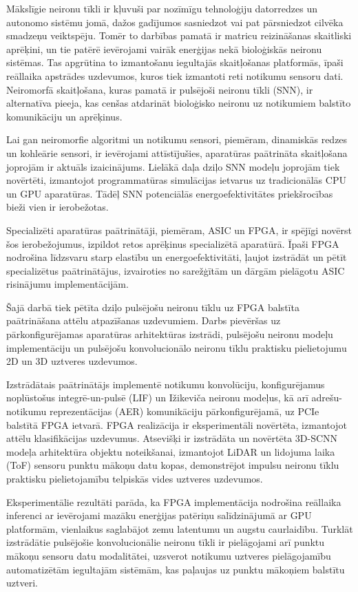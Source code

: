 
Mākslīgie neironu tīkli ir kļuvuši par nozīmīgu tehnoloģiju datorredzes un autonomo sistēmu jomā, dažos gadījumos sasniedzot
vai pat pārsniedzot cilvēka smadzeņu veiktspēju. Tomēr to darbības pamatā ir matricu reizināšanas skaitliski aprēķini, un tie patērē
ievērojami vairāk enerģijas nekā bioloģiskās neironu sistēmas. Tas apgrūtina to izmantošanu iegultajās skaitļošanas
platformās, īpaši reāllaika apstrādes uzdevumos, kuros tiek izmantoti reti notikumu sensoru dati. Neiromorfā
skaitļošana, kuras pamatā ir pulsējoši neironu tīkli (SNN), ir alternatīva pieeja, kas cenšas
atdarināt bioloģisko neironu uz notikumiem balstīto komunikāciju un aprēķinus.

Lai gan neiromorfie algoritmi un notikumu sensori, piemēram, dinamiskās redzes un kohleārie sensori, ir ievērojami
attīstījušies, aparatūras paātrināta skaitļošana joprojām ir aktuāls izaicinājums. Lielākā daļa dziļo SNN modeļu joprojām
tiek novērtēti, izmantojot programmatūras simulācijas ietvarus uz tradicionālās CPU un GPU aparatūras. Tādēļ SNN potenciālās
energoefektivitātes priekšrocības bieži vien ir ierobežotas.

Specializēti aparatūras paātrinātāji, piemēram, ASIC un FPGA, ir spējīgi novērst šos ierobežojumus, izpildot retos
aprēķinus specializētā aparatūrā. Īpaši FPGA nodrošina līdzsvaru starp elastību un energoefektivitāti, ļaujot izstrādāt un
pētīt specializētus paātrinātājus, izvairoties no sarežģītām un dārgām pielāgotu ASIC risinājumu implementācijām.

Šajā darbā tiek pētīta dziļo pulsējošu neironu tīklu uz FPGA balstīta paātrināšana attēlu atpazīšanas uzdevumiem. Darbs
pievēršas uz pārkonfigurējamas aparatūras arhitektūras izstrādi, pulsējošu neironu modeļu implementāciju un pulsējošu
konvolucionālo neironu tīklu praktisku pielietojumu 2D un 3D uztveres uzdevumos.

Izstrādātais paātrinātājs implementē notikumu konvolūciju, konfigurējamus noplūstošus integrē-un-pulsē (LIF) un Ižikeviča
neironu modeļus, kā arī adrešu-notikumu reprezentācijas (AER) komunikāciju pārkonfigurējamā, uz PCIe balstītā FPGA ietvarā.
FPGA realizācija ir eksperimentāli novērtēta, izmantojot attēlu klasifikācijas uzdevumus. Atsevišķi ir izstrādāta
un novērtēta 3D-SCNN modeļa arhitektūra objektu noteikšanai, izmantojot LiDAR un lidojuma laika (ToF) sensoru punktu mākoņu datu
kopas, demonstrējot impulsu neironu tīklu praktisku pielietojamību telpiskās vides uztveres uzdevumos.

Eksperimentālie rezultāti parāda, ka FPGA implementācija nodrošina reāllaika inferenci ar ievērojami mazāku enerģijas
patēriņu salīdzinājumā ar GPU platformām, vienlaikus saglabājot zemu latentumu un augstu caurlaidību. Turklāt izstrādātie
pulsējošie konvolucionālie neironu tīkli ir pielāgojami arī punktu mākoņu sensoru datu modalitātei, uzsverot notikumu
uztveres pielāgojamību automatizētām iegultajām sistēmām, kas paļaujas uz punktu mākoņiem balstītu uztveri.
